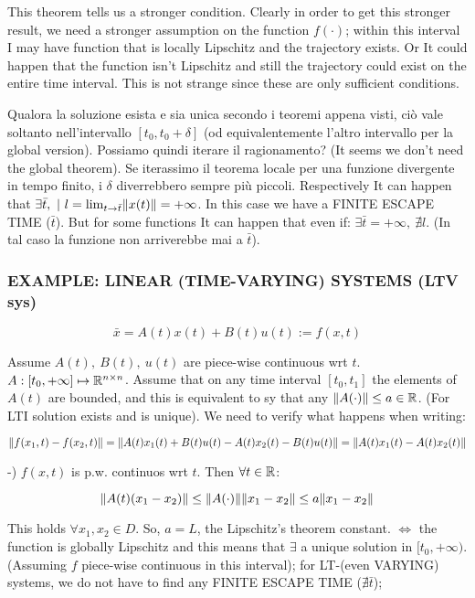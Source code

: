 This theorem tells us a stronger condition. Clearly in order to get this stronger result, we need a stronger assumption on the function $f(\mathord{\cdot})$; within this interval I may have function that is locally Lipschitz and the trajectory exists. Or It could happen that the function isn't Lipschitz and still the trajectory could exist on the entire time interval. This is not strange since these are only sufficient conditions.

Qualora la soluzione esista e sia unica secondo i teoremi appena visti, ciò vale soltanto nell'intervallo $[t_0, t_0 + \delta]$ (od equivalentemente l'altro intervallo per la global version). Possiamo quindi iterare il ragionamento? (It seems we don't need the global theorem). Se iterassimo il teorema locale per una funzione divergente in tempo finito, i $\delta$ diverrebbero sempre più piccoli. Respectively It can happen that $\exists \bar{t},\ |\ l = \lim_{t \to \bar{t}}\lVert x(t)\rVert = +\infty$. In this case we have a FINITE ESCAPE TIME ($\bar{t}$). But for some functions It can happen that even if: $\exists \bar{t} = +\infty,\ \nexists l$. (In tal caso la funzione non arriverebbe mai a $\bar{t}$).

\subsubsection{EXAMPLE: LINEAR (TIME-VARYING) SYSTEMS (LTV sys)}

\[
	\bar{x} = A(t)x(t) + B(t)u(t) := f(x,t)
\]

Assume $A(t),\ B(t),\ u(t)$ are piece-wise continuous wrt $t$. $A: [t_0, +\infty] \mapsto \mathbb{R}^{n\times n}$. Assume that on any time interval $[t_0,t_1]$ the elements of $A(t)$ are bounded, and this is equivalent to sy that any $\lVert A(\mathord{\cdot})\rVert \leq a \in \mathbb{R}$. (For LTI solution exists and is unique). We need to verify what happens when writing:

\[
	\lVert f(x_1,t) - f(x_2,t)\rVert = \lVert A(t)x_1(t) + B(t)u(t) - A(t)x_2(t) - B(t)u(t)\rVert = \lVert A(t)x_1(t) -A(t)x_2(t)\rVert
\]

-) $f(x,t)$ is p.w. continuos wrt $t$. Then $\forall t \in \mathbb{R}$:

\[
	\lVert A(t)(x_1-x_2)\rVert \leq \lVert A(\mathord{\cdot})\rVert\lVert x_1-x_2\rVert \leq a\lVert x_1-x_2\rVert
\]

This holds $\forall x_1,x_2 \in D$. So, $a = L$, the Lipschitz's theorem constant. $\iff$ the function is globally Lipschitz and this means that $\exists$ a unique solution in $[t_0, +\infty)$. (Assuming $f$ piece-wise continuous in this interval); for LT-(even VARYING) systems, we do not have to find any FINITE ESCAPE TIME ($\nexists \bar{t}$);


